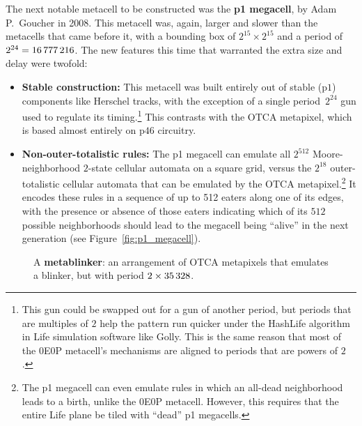The next notable metacell to be constructed was the \textbf{p1 megacell}, by Adam P.~Goucher in 2008. This metacell was, again, larger and slower than the metacells that came before it, with a bounding box of $2^{15} \times 2^{15}$ and a period of $2^{24} = 16{\,}777{\,}216$. The new features this time that warranted the extra size and delay were twofold:\smallskip

\begin{itemize}
	\item \textbf{Stable construction:} This metacell was built entirely out of stable (p$1$) components like Herschel tracks, with the exception of a single period~$2^{24}$ gun used to regulate its timing.\footnote{This gun could be swapped out for a gun of another period, but periods that are multiples of $2$ help the pattern run quicker under the HashLife algorithm in Life simulation software like Golly. This is the same reason that most of the 0E0P metacell's mechanisms are aligned to periods that are powers of $2$.} This contrasts with the OTCA metapixel, which is based almost entirely on p$46$ circuitry.\smallskip
	
	\item \textbf{Non-outer-totalistic rules:} The p1 megacell can emulate all $2^{512}$ Moore-neighborhood $2$-state cellular automata on a square grid, versus the $2^{18}$ outer-totalistic cellular automata that can be emulated by the OTCA metapixel.\footnote{The p1 megacell can even emulate rules in which an all-dead neighborhood leads to a birth, unlike the 0E0P metacell. However, this requires that the entire Life plane be tiled with ``dead'' p1 megacells.} It encodes these rules in a sequence of up to 512 eaters along one of its edges, with the presence or absence of those eaters indicating which of its $512$ possible neighborhoods should lead to the megacell being ``alive'' in the next generation (see Figure~\ref{fig:p1_megacell}).\smallskip
\end{itemize}

\begin{figure}[!htb]
	\centering
	\caption{A \textbf{metablinker}: an arrangement of OTCA metapixels that emulates a blinker, but with period $2 \times 35{\,}328$.}\label{fig:metablinker}
\end{figure}

